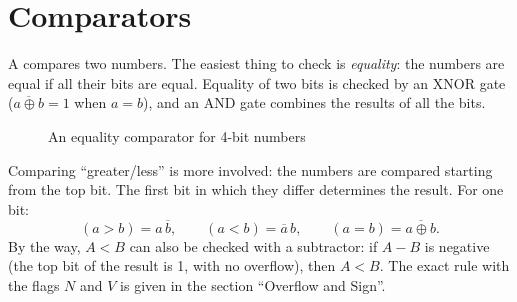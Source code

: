 \section{Comparators}

A  compares two numbers. The easiest thing to check is
\emph{equality}: the numbers are equal if all their bits are equal. Equality of
two bits is checked by an XNOR gate ($\overline{a\oplus b} = 1$ when $a = b$),
and an AND gate combines the results of all the bits.

\begin{figure}[H]
\centering
{}
\caption{An equality comparator for 4-bit numbers}
\label{fig:cmp}
\end{figure}

Comparing ``greater/less'' is more involved: the numbers are compared starting
from the top bit. The first bit in which they differ determines the result. For
one bit:
\[
  (a > b) = a\,\overline{b}, \qquad (a < b) = \overline{a}\,b, \qquad (a = b) = \overline{a\oplus b}.
\]
By the way, $A < B$ can also be checked with a subtractor: if $A - B$ is
negative (the top bit of the result is 1, with no overflow), then $A < B$. The
exact rule with the flags $N$ and $V$ is given in the section ``Overflow and
Sign''.

